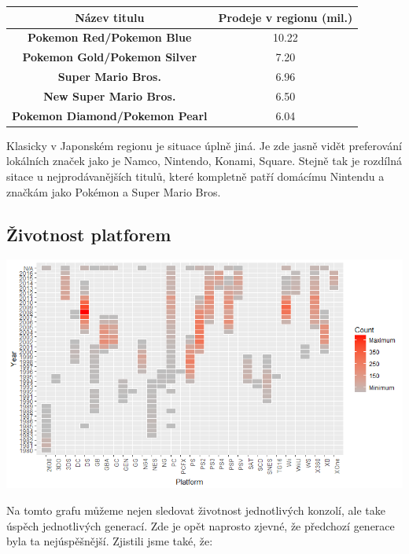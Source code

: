 \documentclass[a4paper,11pt]{article}
\begin{document}
\begin{center}
\begin{tabular}{|c|c|}
\hline
\textbf{Název titulu}                  & \textbf{Prodeje v regionu (mil.)} \\ \hline
\textbf{Pokemon Red/Pokemon Blue}      & 10.22                             \\ \hline
\textbf{Pokemon Gold/Pokemon Silver}   & 7.20                              \\ \hline
\textbf{Super Mario Bros.}             & 6.96                              \\ \hline
\textbf{New Super Mario Bros.}         & 6.50                              \\ \hline
\textbf{Pokemon Diamond/Pokemon Pearl} & 6.04                              \\ \hline
\end{tabular}
\end{center}

Klasicky v Japonském regionu je situace úplně jiná. Je zde jasně vidět preferování lokálních značek jako je Namco, Nintendo, Konami, Square. Stejně tak je rozdílná sitace u nejprodávanějších titulů, které kompletně patří domácímu Nintendu a značkám jako Pokémon a Super Mario Bros.

\newpage


\subsection{Životnost platforem}

\includegraphics[scale=0.75]{Rplot07}

Na tomto grafu můžeme nejen sledovat životnost jednotlivých konzolí, ale take úspěch jednotlivých generací. Zde je opět naprosto zjevné, že předchozí generace byla ta nejúspěšnější. Zjistili jsme také, že:
\end{document}
